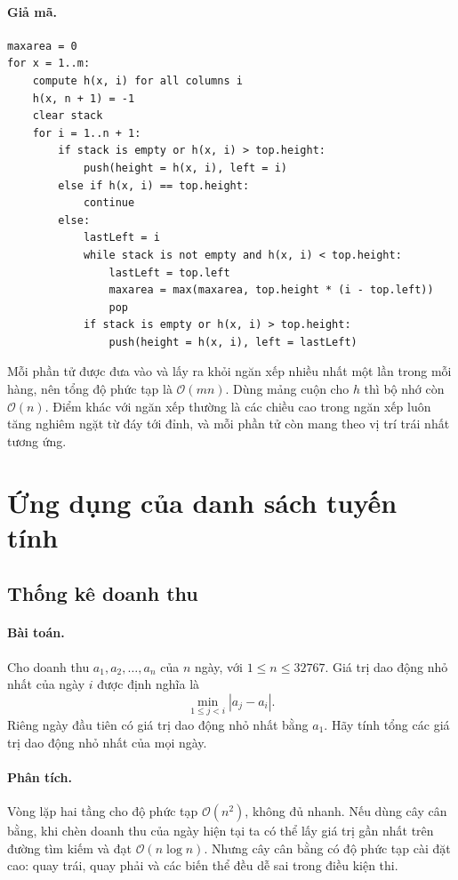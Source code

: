 \documentclass[11pt]{article}
\newcommand{\Oh}{\mathcal{O}}
\begin{document}
\paragraph{Giả mã.}
\begin{verbatim}
maxarea = 0
for x = 1..m:
    compute h(x, i) for all columns i
    h(x, n + 1) = -1
    clear stack
    for i = 1..n + 1:
        if stack is empty or h(x, i) > top.height:
            push(height = h(x, i), left = i)
        else if h(x, i) == top.height:
            continue
        else:
            lastLeft = i
            while stack is not empty and h(x, i) < top.height:
                lastLeft = top.left
                maxarea = max(maxarea, top.height * (i - top.left))
                pop
            if stack is empty or h(x, i) > top.height:
                push(height = h(x, i), left = lastLeft)
\end{verbatim}

Mỗi phần tử được đưa vào và lấy ra khỏi ngăn xếp nhiều nhất một lần trong mỗi
hàng, nên tổng độ phức tạp là \(\Oh(mn)\). Dùng mảng cuộn cho \(h\) thì bộ nhớ
còn \(\Oh(n)\). Điểm khác với ngăn xếp thường là các chiều cao trong ngăn xếp
luôn tăng nghiêm ngặt từ đáy tới đỉnh, và mỗi phần tử còn mang theo vị trí
trái nhất tương ứng.

\section{Ứng dụng của danh sách tuyến tính}

\subsection{Thống kê doanh thu}

\paragraph{Bài toán.}
Cho doanh thu \(a_1,a_2,\ldots,a_n\) của \(n\) ngày, với
\(1\le n\le 32767\). Giá trị dao động nhỏ nhất của ngày \(i\) được định nghĩa
là
\[
  \min_{1\le j<i}|a_j-a_i|.
\]
Riêng ngày đầu tiên có giá trị dao động nhỏ nhất bằng \(a_1\). Hãy tính tổng
các giá trị dao động nhỏ nhất của mọi ngày.

\paragraph{Phân tích.}
Vòng lặp hai tầng cho độ phức tạp \(\Oh(n^2)\), không đủ nhanh. Nếu dùng cây
cân bằng, khi chèn doanh thu của ngày hiện tại ta có thể lấy giá trị gần nhất
trên đường tìm kiếm và đạt \(\Oh(n\log n)\). Nhưng cây cân bằng có độ phức tạp
cài đặt cao: quay trái, quay phải và các biến thể đều dễ sai trong điều kiện
thi.
\end{document}
